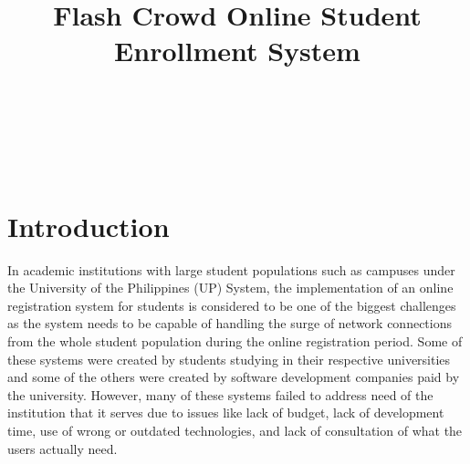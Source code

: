 \documentclass{sigchi}
\def\plaintitle{Flash Crowd Online Student Enrollment System}
\begin{document}
\title{\plaintitle}

\author{%
  \\
  \\
  \\
  \\
}

\maketitle

% 
% 

\section{Introduction}

In academic institutions with large student populations such as campuses under
the University of the Philippines (UP) System, the implementation of an online registration
system for students is considered to be one of the biggest challenges as the system needs
to be capable of handling the surge of network connections from the whole student population
during the online registration period. Some of these systems were created by students studying 
in their respective universities and some of the others were created by software development
companies paid by the university. However, many of these systems failed
to address need of the institution that it serves due to issues like lack of budget, lack of development time,
use of wrong or outdated technologies, and lack of consultation of what the users actually need.
\end{document}
